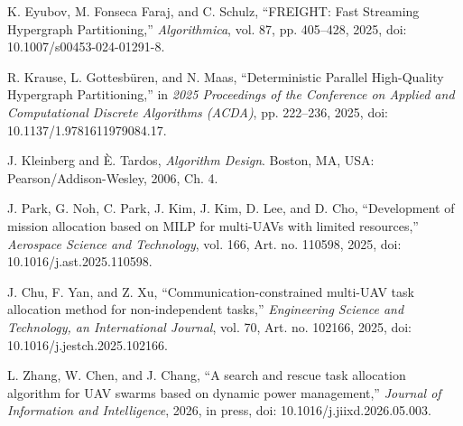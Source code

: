 
K. Eyubov, M. Fonseca Faraj, and C. Schulz,
``FREIGHT: Fast Streaming Hypergraph Partitioning,''
\emph{Algorithmica}, vol. 87, pp. 405--428, 2025,
doi: 10.1007/s00453-024-01291-8.

R. Krause, L. Gottesb\"uren, and N. Maas,
``Deterministic Parallel High-Quality Hypergraph Partitioning,''
in \emph{2025 Proceedings of the Conference on Applied and Computational Discrete Algorithms (ACDA)},
pp. 222--236, 2025,
doi: 10.1137/1.9781611979084.17.

J. Kleinberg and \`E. Tardos,
\emph{Algorithm Design}. Boston, MA, USA: Pearson/Addison-Wesley, 2006, Ch. 4.

J. Park, G. Noh, C. Park, J. Kim, J. Kim, D. Lee, and D. Cho,
``Development of mission allocation based on MILP for multi-UAVs with limited resources,''
\emph{Aerospace Science and Technology}, vol. 166, Art. no. 110598, 2025,
doi: 10.1016/j.ast.2025.110598.

J. Chu, F. Yan, and Z. Xu,
``Communication-constrained multi-UAV task allocation method for non-independent tasks,''
\emph{Engineering Science and Technology, an International Journal}, vol. 70, Art. no. 102166, 2025,
doi: 10.1016/j.jestch.2025.102166.

L. Zhang, W. Chen, and J. Chang,
``A search and rescue task allocation algorithm for UAV swarms based on dynamic power management,''
\emph{Journal of Information and Intelligence}, 2026, in press,
doi: 10.1016/j.jiixd.2026.05.003.
